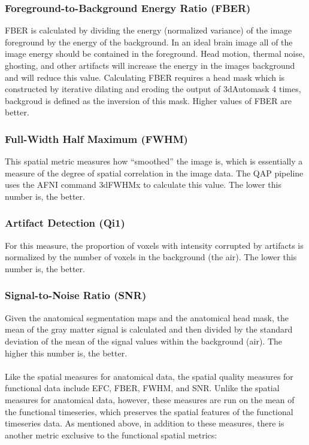 \documentclass{frontiersSCNS} %
\begin{document}
\subsubsection{Foreground-to-Background Energy Ratio (FBER)}
\label{sec:6}
FBER is calculated by dividing the energy (normalized variance) of the image foreground by the energy of the background. In an ideal brain image all of the image energy should be contained in the foreground. Head motion, thermal noise, ghosting, and other artifacts will increase the energy in the images background and will reduce this value. Calculating FBER requires a head mask which is constructed by iterative dilating and eroding the output of 3dAutomask 4 times, backgroud is defined as the inversion of this mask. Higher values of FBER are better. 
\subsubsection{Full-Width Half Maximum (FWHM)}
\label{sec:7}
This spatial metric measures how “smoothed” the image is, which is essentially a measure of the degree of spatial correlation in the image data. The QAP pipeline uses the AFNI command 3dFWHMx to calculate this value. The lower this number is, the better.
\subsubsection{Artifact Detection (Qi1)}
\label{sec:8}
For this measure, the proportion of voxels with intensity corrupted by artifacts is normalized by the number of voxels in the background (the air). The lower this number is, the better.
\subsubsection{Signal-to-Noise Ratio (SNR)}
\label{sec:9}
Given the anatomical segmentation maps and the anatomical head mask, the mean of the gray matter signal is calculated and then divided by the standard deviation of the mean of the signal values within the background (air). The higher this number is, the better.
\\\\
Like the spatial measures for anatomical data, the spatial quality measures for functional data include EFC, FBER, FWHM, and SNR. Unlike the spatial measures for anatomical data, however, these measures are run on the mean of the functional timeseries, which preserves the spatial features of the functional timeseries data. As mentioned above, in addition to these measures, there is another metric exclusive to the functional spatial metrics:
\end{document}
